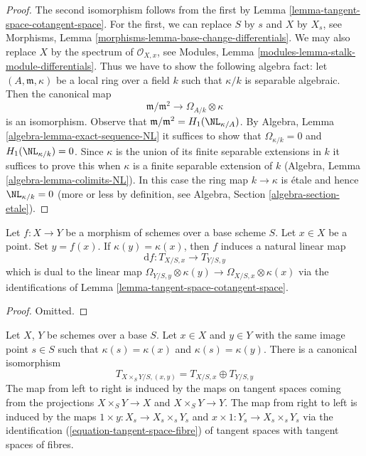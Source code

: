 \begin{proof}
The second isomorphism follows from the first by
Lemma \ref{lemma-tangent-space-cotangent-space}.
For the first, we can replace $S$ by $s$ and $X$ by $X_s$, see
Morphisms, Lemma \ref{morphisms-lemma-base-change-differentials}.
We may also replace $X$ by the spectrum of $\mathcal{O}_{X, x}$, see
Modules, Lemma \ref{modules-lemma-stalk-module-differentials}.
Thus we have to show the following algebra fact: let
$(A, \mathfrak m, \kappa)$ be a local ring over a field $k$
such that $\kappa/k$ is separable algebraic. Then the canonical map
$$
\mathfrak m/\mathfrak m^2
\longrightarrow
\Omega_{A/k} \otimes \kappa
$$
is an isomorphism. Observe that
$\mathfrak m/\mathfrak m^2 = H_1(\NL_{\kappa/A})$. By
Algebra, Lemma \ref{algebra-lemma-exact-sequence-NL}
it suffices to show that $\Omega_{\kappa/k} = 0$ and
$H_1(\NL_{\kappa/k}) = 0$. Since $\kappa$ is the union of
its finite separable extensions in $k$ it suffices to prove
this when $\kappa$ is a finite separable extension of $k$
(Algebra, Lemma \ref{algebra-lemma-colimits-NL}).
In this case the ring map $k \to \kappa$ is \'etale
and hence $\NL_{\kappa/k} = 0$ (more or less by definition, see
Algebra, Section \ref{algebra-section-etale}).
\end{proof}

\begin{lemma}
\label{lemma-map-tangent-spaces}
Let $f : X \to Y$ be a morphism of schemes over a base scheme $S$.
Let $x \in X$ be a point. Set $y = f(x)$. If $\kappa(y) = \kappa(x)$,
then $f$ induces a natural linear map
$$
\text{d}f : T_{X/S, x} \longrightarrow T_{Y/S, y}
$$
which is dual to the linear map
$\Omega_{Y/S, y} \otimes \kappa(y) \to \Omega_{X/S, x} \otimes \kappa(x)$
via the identifications of Lemma \ref{lemma-tangent-space-cotangent-space}.
\end{lemma}

\begin{proof}
Omitted.
\end{proof}

\begin{lemma}
\label{lemma-tangent-space-product}
Let $X$, $Y$ be schemes over a base $S$. Let $x \in X$ and $y \in Y$ with
the same image point $s \in S$ such that $\kappa(s) = \kappa(x)$ and
$\kappa(s) = \kappa(y)$. There is a canonical isomorphism
$$
T_{X \times_S Y/S, (x, y)} = T_{X/S, x} \oplus T_{Y/S, y}
$$
The map from left to right is induced by the maps on tangent spaces coming
from the projections $X \times_S Y \to X$ and $X \times_S Y \to Y$.
The map from right to left is induced by the maps
$1 \times y : X_s \to X_s \times_s Y_s$ and
$x \times 1 : Y_s \to X_s \times_s Y_s$ via the identification
(\ref{equation-tangent-space-fibre}) of
tangent spaces with tangent spaces of fibres.
\end{lemma}

